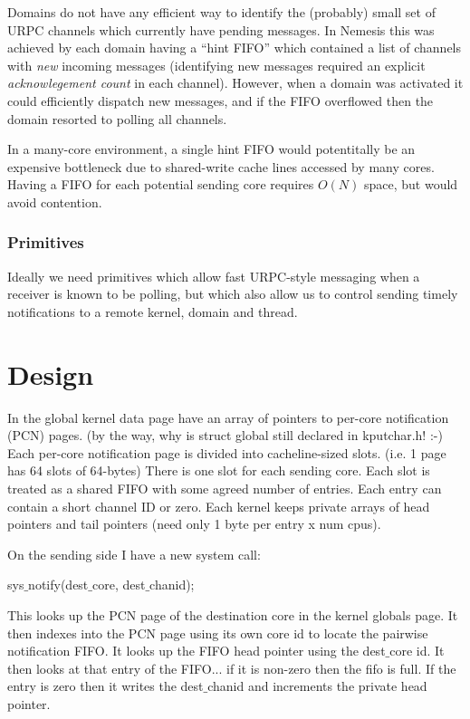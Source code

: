 \documentclass[a4paper,11pt,twoside]{report}
\begin{document}
Domains do not have any efficient way to identify the (probably) small
set of URPC channels which currently have pending messages. In Nemesis
this was achieved by each domain having a ``hint FIFO'' which
contained a list of channels with \emph{new} incoming messages
(identifying new messages required an explicit \emph{acknowlegement
  count} in each channel).  However, when a domain was activated it
could efficiently dispatch new messages, and if the FIFO overflowed
then the domain resorted to polling all channels.

In a many-core environment, a single hint FIFO would potentitally be
an expensive bottleneck due to shared-write cache lines accessed by
many cores.  Having a FIFO for each potential sending core requires
$O(N)$ space, but would avoid contention.

\subsection{Primitives} 

Ideally we need primitives which allow fast URPC-style messaging when
a receiver is known to be polling, but which also allow us to control
sending timely notifications to a remote kernel, domain and thread. 

\chapter{Design}

In the global kernel data page have an array of pointers to per-core
notification (PCN) pages.  (by the way, why is struct global still
declared in kputchar.h! :-) Each per-core notification page is divided
into cacheline-sized slots. (i.e. 1 page has 64 slots of 64-bytes)
There is one slot for each sending core.  Each slot is treated as a
shared FIFO with some agreed number of entries.  Each entry can
contain a short channel ID or zero.  Each kernel keeps private arrays
of head pointers and tail pointers (need only 1 byte per entry x
num cpus).

On the sending side I have a new system call:

sys$\_$notify(dest$\_$core, dest$\_$chanid);

This looks up the PCN page of the destination core in the kernel globals page.
It then indexes into the PCN page using its own core id to locate the pairwise notification FIFO.
It looks up the FIFO head pointer using the dest$\_$core id.
It then looks at that entry of the FIFO... if it is non-zero then the fifo is full.
If the entry is zero then it writes the dest$\_$chanid and increments the private head pointer.
\end{document}
